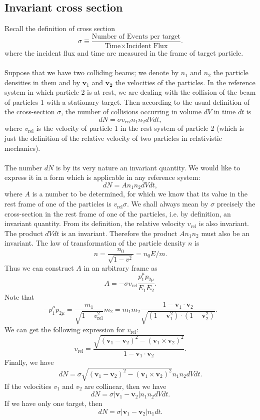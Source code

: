 \subsection{Invariant cross section}
Recall the definition of cross section
\[\sigma \equiv \frac{\mbox{Number of Events per target}}{\mbox{Time} \times \mbox{Incident Flux}}.\]
where the incident flux and time are measured in the frame of target particle.
\\ \\
Suppose that we have two colliding beams; we denote by $n_1$ and $n_2$ the particle densities in them and by $\bm{v}_1$ and $\bm{v_2}$ the velocities of the particles. In the reference system in which particle 2 is at rest, we are dealing with the collision of the beam of particles 1 with a stationary target. Then according to the usual definition of the cross-section $\sigma$, the number of collisions occurring in volume $dV$ in time $dt$ is 
\[dN = \sigma v_{rel} n_1 n_2 dV dt,\]
where $v_{\mathrm{rel}}$ is the velocity of particle 1 in the rest system of particle 2 (which is just the definition of the relative velocity of two particles in relativistic mechanics). 
\\ \\
The number $dN$ is by its very nature an invariant quantity. We would like to express it in a form which is applicable in any reference system: 
\[dN = A n_1 n_2 dV dt,\] 
where $A$ is a number to be determined, for which we know that its value in the rest frame of one of the particles is $v_{\mathrm{rel}} \sigma$. We shall always mean by $\sigma$ precisely the cross-section in the rest frame of one of the particles, i.e. by definition, an invariant quantity. From its definition, the relative velocity $v_{\mathrm{rel}}$ is also invariant. The product $dVdt$ is an invariant. Therefore the product $A n_1 n_2$ must also be an invariant. The law of transformation of the particle density $n$ is
\[n = \frac{n_0}{\sqrt{1-v^2}} = n_0 E/m.\]
Thus we can construct $A$ in an arbitrary frame as
\[A = -\sigma v_{\mathrm{rel}} \frac{p_1^{\mu}p_{2\mu}}{E_1 E_2}.\]
Note that
\[-p_1^{\mu}p_{2\mu} = \frac{m_1}{\sqrt{1-v_{\mathrm{rel}}^2}}m_2 = m_1 m_2 \frac{1-\bm{v}_1\cdot\bm{v}_2}{\sqrt{(1-\bm{v}_1^2)\cdot(1-\bm{v}_2^2)}}.\]
We can get the following expression for $v_{\mathrm{rel}}$:
\[v_{\mathrm{rel}} = \frac{\sqrt{(\bm{v}_1-\bm{v}_2)^2-(\bm{v}_1\times\bm{v}_2)^2}}{1-\bm{v}_1\cdot\bm{v}_2}.\]
Finally, we have
\[dN = \sigma \sqrt{(\bm{v}_1-\bm{v}_2)^2-(\bm{v}_1\times\bm{v}_2)^2} n_1 n_2 dV dt.\]
If the velocities $v_1$ and $v_2$ are collinear, then we have
\[dN = \sigma |\bm{v}_1 - \bm{v}_2| n_1 n_2 dV dt.\]
If we have only one target, then
\[dN = \sigma |\bm{v}_1 - \bm{v}_2| n_1 dt.\]

